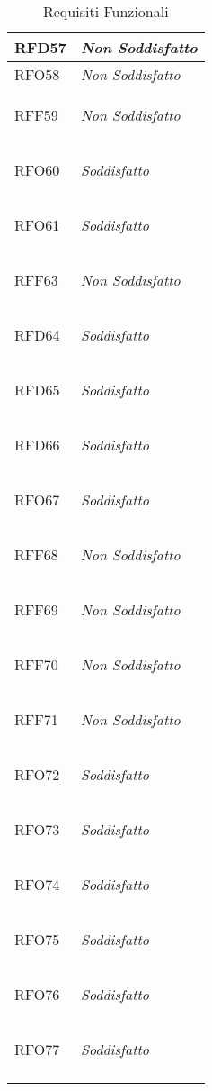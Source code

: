 \begin{longtable}{|>{\centering}m{5cm}|m{5cm}<{\centering}|}
    \hypertarget{RFD57}{RFD57} & \textit{Non Soddisfatto}\\ \hline
   
    \hypertarget{RFO58}{RFO58} & \textit{Non Soddisfatto}\\ \hline
   
    \hypertarget{RFF59}{RFF59} & \textit{Non Soddisfatto}\\ \hline
   
    \hypertarget{RFO60}{RFO60} & \textit{Soddisfatto}\\ \hline
   
    \hypertarget{RFO61}{RFO61} & \textit{Soddisfatto}\\ \hline
   
    \hypertarget{RFF63}{RFF63} & \textit{Non Soddisfatto}\\ \hline
   
    \hypertarget{RFD64}{RFD64} & \textit{Soddisfatto}\\ \hline
   
    \hypertarget{RFD65}{RFD65} & \textit{Soddisfatto}\\ \hline
   
    \hypertarget{RFD66}{RFD66} & \textit{Soddisfatto}\\ \hline
   
    \hypertarget{RFO67}{RFO67} & \textit{Soddisfatto}\\ \hline
   
    \hypertarget{RFF68}{RFF68} & \textit{Non Soddisfatto}\\ \hline
   
    \hypertarget{RFF69}{RFF69} & \textit{Non Soddisfatto}\\ \hline
   
    \hypertarget{RFF70}{RFF70} & \textit{Non Soddisfatto}\\ \hline
   
    \hypertarget{RFF71}{RFF71} & \textit{Non Soddisfatto}\\ \hline
   
    \hypertarget{RFO72}{RFO72} & \textit{Soddisfatto}\\ \hline
   
    \hypertarget{RFO73}{RFO73} & \textit{Soddisfatto}\\ \hline
   
    \hypertarget{RFO74}{RFO74} & \textit{Soddisfatto}\\ \hline
   
    \hypertarget{RFO75}{RFO75} & \textit{Soddisfatto}\\ \hline
   
    \hypertarget{RFO76}{RFO76} & \textit{Soddisfatto}\\ \hline
   
    \hypertarget{RFO77}{RFO77} & \textit{Soddisfatto}\\ \hline
   
    \caption[Requisiti Funzionali]{Requisiti Funzionali}
    \label{tabella:req0}
\end{longtable}
\clearpage
